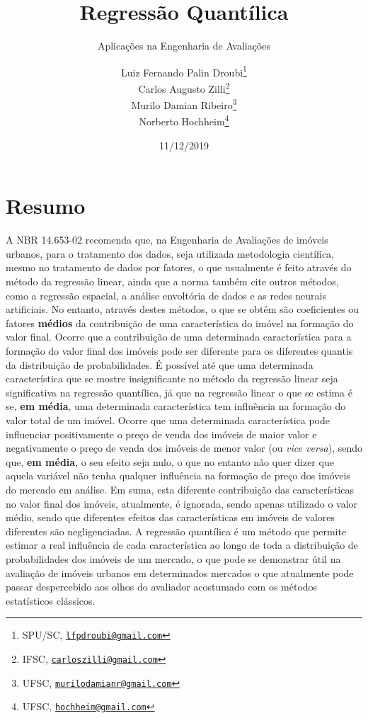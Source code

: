 \documentclass[a4paper, 12pt]{article}
\title{Regressão Quantílica}
\subtitle{Aplicações na Engenharia de Avaliações}
\author{Luiz Fernando Palin Droubi\footnote{SPU/SC,
  \href{mailto:lfpdroubi@gmail.com}{\nolinkurl{lfpdroubi@gmail.com}}} \\ Carlos Augusto Zilli\footnote{IFSC,
  \href{mailto:carloszilli@gmail.com}{\nolinkurl{carloszilli@gmail.com}}} \\ Murilo Damian Ribeiro\footnote{UFSC,
  \href{mailto:murilodamianr@gmail.com}{\nolinkurl{murilodamianr@gmail.com}}
} \\ Norberto Hochheim\footnote{UFSC,
  \href{mailto:hochheim@gmail.com}{\nolinkurl{hochheim@gmail.com}}}}
\date{11/12/2019}
\begin{document}
\maketitle

\hypertarget{resumo}{%
\section*{Resumo}\label{resumo}}

A NBR 14.653-02 recomenda que, na Engenharia de Avaliações de imóveis
urbanos, para o tratamento dos dados, seja utilizada metodologia
científica, mesmo no tratamento de dados por fatores, o que usualmente é
feito através do método da regressão linear, ainda que a norma também
cite outros métodos, como a regressão espacial, a análise envoltória de
dados e as redes neurais artificiais. No entanto, através destes
métodos, o que se obtém são coeficientes ou fatores \textbf{médios} da
contribuição de uma característica do imóvel na formação do valor final.
Ocorre que a contribuição de uma determinada característica para a
formação do valor final dos imóveis pode ser diferente para os
diferentes quantis da distribuição de probabilidades. É possível até que
uma determinada característica que se mostre insignificante no método da
regressão linear seja significativa na regressão quantílica, já que na
regressão linear o que se estima é se, \textbf{em média}, uma
determinada característica tem influência na formação do valor total de
um imóvel. Ocorre que uma determinada característica pode influenciar
positivamente o preço de venda dos imóveis de maior valor e
negativamente o preço de venda dos imóveis de menor valor (ou \emph{vice
versa}), sendo que, \textbf{em média}, o seu efeito seja nulo, o que no
entanto não quer dizer que aquela variável não tenha qualquer influência
na formação de preço dos imóveis do mercado em análise. Em suma, esta
diferente contribuição das características no valor final dos imóveis,
atualmente, é ignorada, sendo apenas utilizado o valor médio, sendo que
diferentes efeitos das características em imóveis de valores diferentes
são negligenciadas. A regressão quantílica é um método que permite
estimar a real influência de cada característica ao longo de toda a
distribuição de probabilidades dos imóveis de um mercado, o que pode se
demonstrar útil na avaliação de imóveis urbanos em determinados mercados
o que atualmente pode passar despercebido aos olhos do avaliador
acostumado com os métodos estatísticos clássicos.
\end{document}
